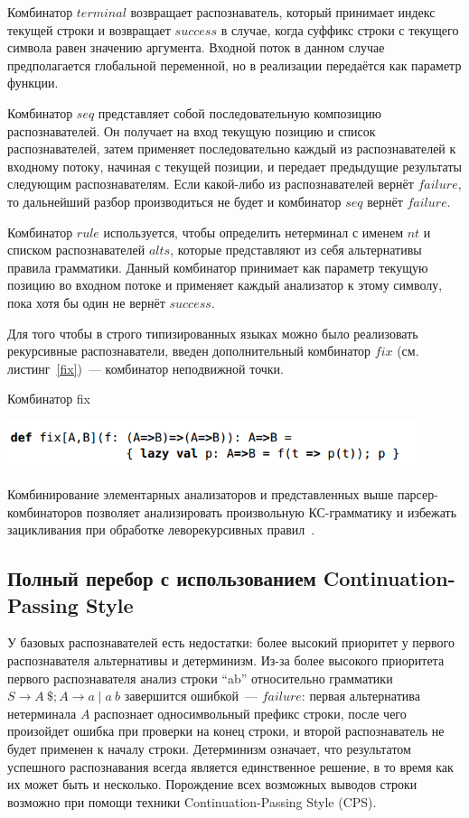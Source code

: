 Комбинатор $terminal$ возвращает распознаватель, который принимает индекс текущей строки и возвращает $success$ в случае, когда суффикс строки с текущего символа равен значению аргумента. Входной поток в данном случае предполагается глобальной переменной, но в реализации передаётся как параметр функции. 

Комбинатор $seq$ представляет собой последовательную композицию распознавателей. Он получает на вход текущую позицию и список распознавателей, затем применяет последовательно каждый из распознавателей к входному потоку, начиная с текущей позиции, и передает предыдущие результаты следующим распознавателям. Если какой-либо из распознавателей вернёт $failure$, то дальнейший разбор производиться не будет и комбинатор $seq$ вернёт $failure$. 

 Комбинатор $rule$ используется, чтобы определить нетерминал с именем $nt$ и списком распознавателей $alts$, которые представляют из себя альтернативы правила грамматики. Данный комбинатор принимает как параметр текущую позицию во входном потоке и применяет каждый анализатор к этому символу, пока хотя бы один не вернёт $success$. 

Для того чтобы в строго типизированных языках можно было реализовать рекурсивные распознаватели, введен дополнительный комбинатор $fix$ (см. листинг~\ref{fix})~--- комбинатор неподвижной точки.

\begin{listing}
\caption{Комбинатор fix}
\label{fix}
\centering
\includegraphics[width=0.9\textwidth]{Smolina/pics/fix.png}
\end{listing} 

Комбинирование элементарных анализаторов и представленных выше парсер-комбинаторов позволяет анализировать произвольную КС-грамматику и избежать зацикливания при обработке леворекурсивных правил~\cite{GLL}.

\subsection{Полный перебор с использованием Continuation-Passing Style}
У базовых распознавателей есть недостатки: более высокий приоритет у первого распознавателя альтернативы и детерминизм. Из-за более высокого приоритета первого распознавателя анализ строки ``ab'' относительно грамматики $S \rightarrow A \ \$; A \rightarrow a \mid a \ b$ завершится ошибкой~--- $failure$: первая альтернатива нетерминала $A$ распознает односимвольный префикс строки, после чего произойдет ошибка при проверки на конец строки, и второй распознаватель не будет применен к началу строки. Детерминизм означает, что результатом успешного распознавания всегда является единственное решение, в то время как их может быть и несколько. Порождение всех возможных выводов строки возможно при помощи техники Continuation-Passing Style (CPS).

